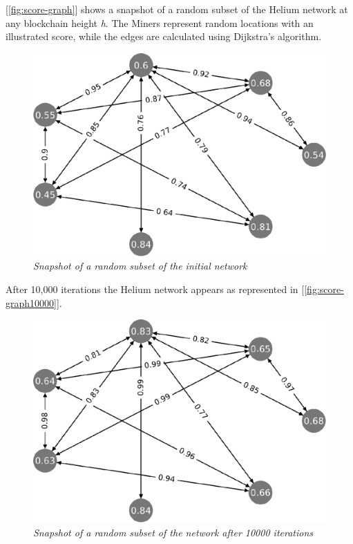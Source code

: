 \documentclass[10pt, nonatbib, nocopyrightspace, reprint]{sigplanconf}
\newcommand{\figref}[1]{[\autoref{#1}]}
\begin{document}
\figref{fig:score-graph} shows a snapshot of a random subset of the Helium network at any blockchain height \textit{h}. The Miners represent random locations with an illustrated score, while the edges are calculated using Dijkstra's algorithm\cite{dijkstra}.

\begin{figure}[ht]
    \begin{center}
          \includegraphics[width=0.8\columnwidth]{chart.eps}
          \caption{\emph{Snapshot of a random subset of the initial network}}\label{fig:score-graph}
     \end{center}
\end{figure}

After 10,000 iterations the Helium network appears as represented in \figref{fig:score-graph10000}.

\begin{figure}[ht]
    \begin{center}
          \includegraphics[width=0.8\columnwidth]{chart1000.eps}
          \caption{\emph{Snapshot of a random subset of the network after 10000 iterations}}\label{fig:score-graph10000}
     \end{center}
\end{figure}
\end{document}

